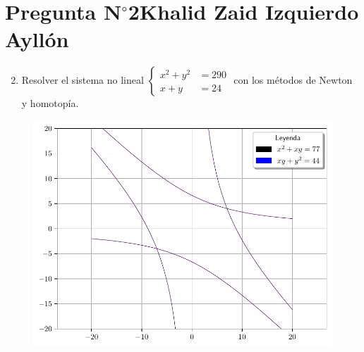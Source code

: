 \section{Pregunta N$^{\circ}$2\qquad Khalid Zaid Izquierdo Ayllón}

\begin{frame}
	\begin{enumerate}\setcounter{enumi}{1}
		\item

		      Resolver el sistema no lineal
		      \begin{math}
			      \left\{
			      \begin{aligned}
				      x^{2} + y^{2} & = 290 \\
				      x + y         & = 24
			      \end{aligned}
			      \right.
		      \end{math}
		      con los métodos de Newton y
		      homotopía.
	\end{enumerate}

	\begin{solution}
		\begin{figure}[ht!]
			\centering
			\includegraphics[width=0.5\paperwidth]{p2}
		\end{figure}
	\end{solution}
\end{frame}